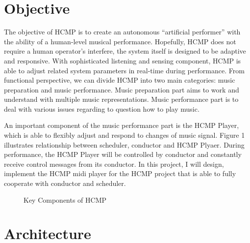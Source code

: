 \section{Objective}
The objective of HCMP \cite{Dawen:2011} is to create an autonomous 
``artificial performer'' with the ability of a human-level musical performance. 
Hopefully, HCMP does not require a human operator's interfere, the system itself 
is designed to be adaptive and responsive. With sophisticated listening and sensing
component, HCMP is able to adjust related system parameters in real-time during 
performance. From functional perspective, we can divide HCMP into two main
categories: music preparation and music performance. Music preparation
part aims to work and understand with multiple music representations. Music
performance part is to deal with various issues regarding to question 
how to play music.     

An important component of the music performance part is the HCMP Player, 
which is able to flexibly  
adjust and respond to changes of music signal. Figure 1 illustrates relationship 
between scheduler, conductor and HCMP Plyaer. During performance, the HCMP Player will 
be controlled by conductor and constantly receive control messages 
from its conductor. In this project, I will design, implement the HCMP midi player 
for the HCMP project that is able to fully cooperate with conductor and scheduler.
\begin{figure}[H] %
\caption{Key Components of HCMP}
\label{fig:speciation}
\end{figure}
 

\section{Architecture}
